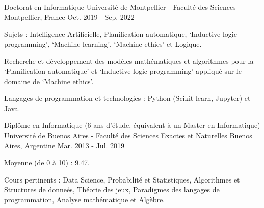 

\begin{cventries}

  \cventry
    {Doctorat en Informatique}
    {Université de Montpellier - Faculté des Sciences}
    {Montpellier, France}
    {Oct. 2019 - Sep. 2022}
    {
      \begin{cvitems}
        \item Sujets : Intelligence Artificielle, Planification automatique, `Inductive logic programming', `Machine learning', `Machine ethics' et Logique.
        \item Recherche et développement des modèles mathématiques et algorithmes pour la `Planification automatique' et `Inductive logic programming' appliqué sur le domaine de `Machine ethics'.
        \item Langages de programmation et technologies : Python (Scikit-learn, Jupyter) et Java.
      \end{cvitems}
    }  

  \cventry
  {Diplôme en Informatique (6 ans d'étude, équivalent à un Master en Informatique)}
  {Université de Buenos Aires - Faculté des Sciences Exactes et Naturelles}
  {Buenos Aires, Argentine}
  {Mar. 2013 - Jul. 2019}
  {
    \begin{cvitems}
      \item Moyenne (de 0 à 10) : 9.47.
      \item Cours pertinents : Data Science, Probabilité et Statistiques, Algorithmes et Structures de donneés, Théorie des jeux, Paradigmes des langages de programmation, Analyse mathématique et Algèbre.
    \end{cvitems}
  }  

\end{cventries}

